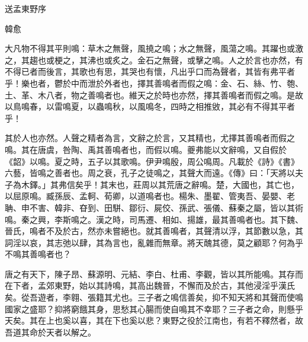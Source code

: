 送孟東野序

韓愈

大凡物不得其平則鳴：草木之無聲，風撓之鳴；水之無聲，風蕩之鳴。其躍也或激之，其趨也或梗之，其沸也或炙之。金石之無聲，或擊之鳴。人之於言也亦然，有不得已者而後言，其歌也有思，其哭也有懷，凡出乎口而為聲者，其皆有弗平者乎！樂也者，鬱於中而泄於外者也，擇其善鳴者而假之鳴：金、石、絲、竹、匏、土、革、木八者，物之善鳴者也。維天之於時也亦然，擇其善鳴者而假之鳴。是故以鳥鳴春，以雷鳴夏，以蟲鳴秋，以風鳴冬，四時之相推敓，其必有不得其平者乎！

其於人也亦然。人聲之精者為言，文辭之於言，又其精也，尤擇其善鳴者而假之鳴。其在唐虞，咎陶、禹其善鳴者也，而假以鳴。夔弗能以文辭鳴，又自假於《韶》以鳴。夏之時，五子以其歌鳴。伊尹鳴殷，周公鳴周。凡載於《詩》《書》六藝，皆鳴之善者也。周之衰，孔子之徒鳴之，其聲大而遠。《傳》曰：「天將以夫子為木鐸。」其弗信矣乎！其末也，莊周以其荒唐之辭鳴。楚，大國也，其亡也，以屈原鳴。臧孫辰、孟軻、荀卿，以道鳴者也。楊朱、墨翟、管夷吾、晏嬰、老聃、申不害、韓非、昚到、田駢、鄒衍、屍佼、孫武、張儀、蘇秦之屬，皆以其術鳴。秦之興，李斯鳴之。漢之時，司馬遷、相如、揚雄，最其善鳴者也。其下魏、晉氏，鳴者不及於古，然亦未嘗絕也。就其善鳴者，其聲清以浮，其節數以急，其詞淫以哀，其志弛以肆，其為言也，亂雜而無章。將天醜其德，莫之顧耶？何為乎不鳴其善鳴者也？

唐之有天下，陳子昂、蘇源明、元結、李白、杜甫、李觀，皆以其所能鳴。其存而在下者，孟郊東野，始以其詩鳴，其高出魏晉，不懈而及於古，其他浸淫乎漢氏矣。從吾遊者，李翱、張籍其尤也。三子者之鳴信善矣，抑不知天將和其聲而使鳴國家之盛耶？抑將窮餓其身，思愁其心腸而使自鳴其不幸耶？三子者之命，則懸乎天矣。其在上也奚以喜，其在下也奚以悲？東野之役於江南也，有若不釋然者，故吾道其命於天者以解之。